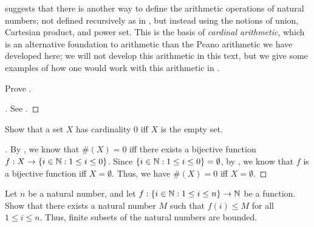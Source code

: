 \begin{rmk}\label{i:3.6.15}
   suggests that there is another way to define the arithmetic operations of natural numbers;
  not defined recursively as in , but instead using the notions of union, Cartesian product, and power set.
  This is the basis of \emph{cardinal arithmetic}, which is an alternative foundation to arithmetic than the Peano arithmetic we have developed here;
  we will not develop this arithmetic in this text, but we give some examples of how one would work with this arithmetic in .
\end{rmk}

\exercisesection

\begin{ex}\label{i:ex:3.6.1}
  Prove .
\end{ex}

\begin{proof}[]
  See .
\end{proof}

\begin{ex}\label{i:ex:3.6.2}
  Show that a set \(X\) has cardinality \(0\) iff \(X\) is the empty set.
\end{ex}

\begin{proof}[]
  By , we know that \(\#(X) = 0\) iff there exists a bijective function \(f : X \to \left\lbrace i \in \mathbb{N} : 1 \leq i \leq 0\right\rbrace\).
  Since \(\left\lbrace i \in \mathbb{N} : 1 \leq i \leq 0\right\rbrace = \emptyset\), by , we know that \(f\) is a bijective function iff \(X = \emptyset\).
  Thus, we have \(\#(X) = 0\) iff \(X = \emptyset\).
\end{proof}

\begin{ex}\label{i:ex:3.6.3}
  Let \(n\) be a natural number, and let \(f : \left\lbrace i \in \mathbb{N} : 1 \leq i \leq n\right\rbrace \to \mathbb{N}\) be a function.
  Show that there exists a natural number \(M\) such that \(f(i) \leq M\) for all \(1 \leq i \leq n\).
  Thus, finite subsets of the natural numbers are bounded.
\end{ex}

